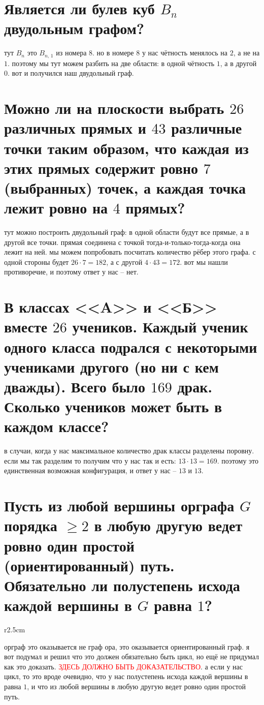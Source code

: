 \documentclass{article}
\begin{document}
  \section{Является ли булев куб $B_n$ двудольным графом?}
  тут $B_n$ это $B_{n,\, 1}$ из номера 8.
  но в номере 8 у нас чётность менялось на $2$, а не на $1$.
  поэтому мы тут можем разбить на две области: в одной чётность $1$, а в другой $0$.
  вот и получился наш двудольный граф.

  \section{Можно ли на плоскости выбрать $26$ различных прямых и $43$ различные точки таким образом, что каждая из этих прямых содержит ровно $7$ (выбранных) точек, а каждая точка лежит ровно на $4$ прямых?}
  тут можно построить двудольный граф:
  в одной области будут все прямые, а в другой все точки.
  прямая соединена с точкой тогда-и-только-тогда-когда она лежит на ней.
  мы можем попробовать посчитать количество рёбер этого графа.
  с одной стороны будет $26 \cdot 7 = 182$, а с другой $4 \cdot 43 = 172$.
  вот мы нашли противоречие, и поэтому ответ у нас -- нет.

  \section{В классах <<A>> и <<Б>> вместе $26$ учеников. Каждый ученик одного класса подрался с некоторыми учениками другого (но ни с кем дважды). Всего было $169$ драк. Сколько учеников может быть в каждом классе?}
  в случаи, когда у нас максимальное количество драк классы разделены поровну.
  если мы так разделим то получим что у нас так и есть: $13 \cdot 13 = 169$.
  поэтому это единственная возможная конфигурация, и ответ у нас -- $13$ и $13$.

  \section{Пусть из любой вершины орграфа $G$ порядка $\geq 2$ в любую другую ведет ровно один простой (ориентированный) путь. Обязательно ли полустепень исхода каждой вершины в $G$ равна $1$?}
  \begin{wrapfigure}{r}{2.5cm}
    \vspace{-1cm}
    \vspace{-1cm}
  \end{wrapfigure}
  орграф это оказывается не граф ора, это оказывается ориентированный граф.
  я вот подумал и решил что это должен обязательно быть цикл, но ещё не придумал как это доказать.
  \textcolor{red}{ЗДЕСЬ ДОЛЖНО БЫТЬ ДОКАЗАТЕЛЬСТВО}.
  а если у нас цикл, то это вроде очевидно, что у нас полустепень исхода каждой вершины в равна $1$,
  и что из любой вершины в любую другую ведет ровно один простой путь.
\end{document}
